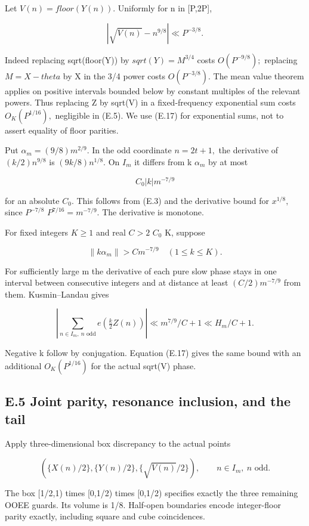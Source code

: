 \documentclass[11pt,a4paper]{article}
\begin{document}
Let \(V(n)=floor(Y(n)).\) Uniformly for n in {[}P,2P{]},

\[
 |\sqrt{V(n)}-n^{9/8}|\ll P^{-3/8}.
 \tag{E.17}
\]

Indeed replacing sqrt(floor(Y)) by \(sqrt(Y)=M^{3/4}\) costs
\(O(P^{-9/8});\) replacing \(M=X-theta\) by X in the 3/4 power costs
\(O(P^{-3/8}).\) The mean value theorem applies on positive intervals
bounded below by constant multiples of the relevant powers. Thus
replacing Z by sqrt(V) in a fixed-frequency exponential sum costs
\(O_K(P^{1/16}),\) negligible in (E.5). We use (E.17) for exponential
sums, not to assert equality of floor parities.

Put \(\alpha_m=(9/8)m^{2/9}.\) In the odd coordinate \(n=2t+1,\) the
derivative of \((k/2)n^{9/8}\) is \((9k/8)n^{1/8}.\) On \(I_m\) it
differs from k \(\alpha_m\) by at most

\[
 C_0 |k|m^{-7/9}
 \tag{E.18}
\]

for an absolute \(C_0.\) This follows from (E.3) and the derivative
bound for \(x^{1/8},\) since \(P^{-7/8}\) \(P^{7/16}=m^{-7/9}.\) The
derivative is monotone.

For fixed integers \(K\ge 1\) and real \(C>2\) \(C_0\) K, suppose

\[
 \|k\alpha_m\|>C m^{-7/9}\quad(1\le k\le K).
 \tag{E.19}
\]

For sufficiently large m the derivative of each pure slow phase stays in
one interval between consecutive integers and at distance at least
\((C/2)m^{-7/9}\) from them. Kusmin--Landau gives

\[
 \left|\sum_{n\in I_m,\ n\text{ odd}}e\left(\tfrac k2 Z(n)\right)\right|
       \ll m^{7/9}/C+1\ll H_m/C+1.
 \tag{E.20}
\]

Negative k follow by conjugation. Equation (E.17) gives the same bound
with an additional \(O_K(P^{1/16})\) for the actual sqrt(V) phase.

\subsection{E.5 Joint parity, resonance inclusion, and the
tail}\label{e.5-joint-parity-resonance-inclusion-and-the-tail}

Apply three-dimensional box discrepancy to the actual points

\[
 \left(\{X(n)/2\},\{Y(n)/2\},\{\sqrt{V(n)}/2\}\right),
                  \qquad n\in I_m,\ n\text{ odd}.
\]

The box {[}1/2,1) times {[}0,1/2) times {[}0,1/2) specifies exactly the
three remaining OOEE guards. Its volume is 1/8. Half-open boundaries
encode integer-floor parity exactly, including square and cube
coincidences.
\end{document}
